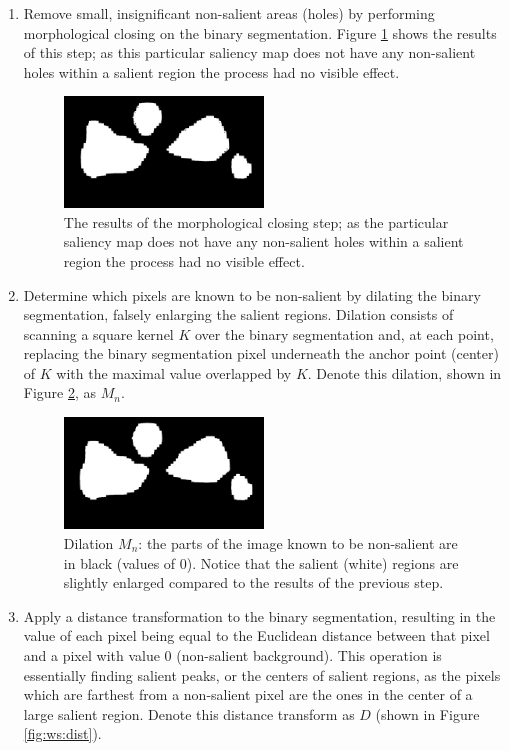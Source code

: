 \begin{enumerate}
\item
Remove small, insignificant non-salient areas (holes) by performing morphological closing on the binary segmentation. Figure \ref{fig:ws:close} shows the results of this step; as this particular saliency map does not have any non-salient holes within a salient region the process had no visible effect.

\begin{figure}[htbp]
  \centering
  \includegraphics[width=0.5\textwidth]{ws_images/ws_close.png}
  \caption{The results of the morphological closing step; as the particular saliency map does not have any non-salient holes within a salient region the process had no visible effect.}
  \label{fig:ws:close}
\end{figure}

\item
Determine which pixels are known to be non-salient by dilating the binary segmentation, falsely enlarging the salient regions. Dilation consists of scanning a square kernel $K$ over the binary segmentation and, at each point, replacing the binary segmentation pixel underneath the anchor point (center) of $K$ with the maximal value overlapped by $K$. Denote this dilation, shown in Figure \ref{fig:ws:bg}, as $M_n$.

\begin{figure}[htbp]
  \centering
  \includegraphics[width=0.5\textwidth]{ws_images/ws_bg.png}
  \caption{Dilation $M_n$: the parts of the image known to be non-salient are in black (values of 0). Notice that the salient (white) regions are slightly enlarged compared to the results of the previous step.}
  \label{fig:ws:bg}
\end{figure}

\item
Apply a distance transformation to the binary segmentation, resulting in the value of each pixel being equal to the Euclidean distance between that pixel and a pixel with value 0 (non-salient background). This operation is essentially finding salient peaks, or the centers of salient regions, as the pixels which are farthest from a non-salient pixel are the ones in the center of a large salient region. Denote this distance transform as $D$ (shown in Figure \ref{fig:ws:dist}).


\end{enumerate}
